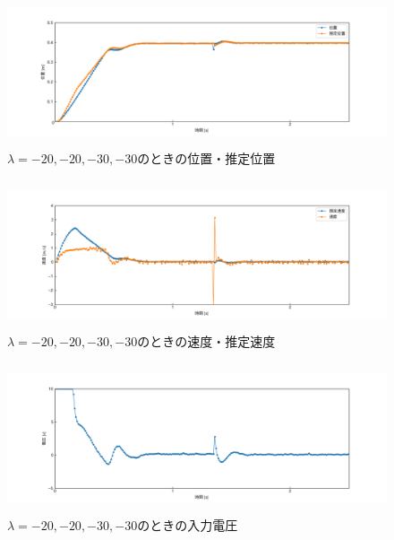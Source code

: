 \documentclass[12pt]{jsarticle}
\begin{document}
\begin{figure}[H]
  \begin{center}
    \includegraphics[clip,width=13.0cm, height=4.4cm]{../img/Exp12-1.png}
    \caption{$\lambda=-20, -20, -30, -30$のときの位置・推定位置}
    \label{Exp12-1}
  \end{center}
\end{figure}
\begin{figure}[H]
  \begin{center}
    \includegraphics[clip,width=13.0cm, height=4.4cm]{../img/Exp12-2.png}
    \caption{$\lambda=-20, -20, -30, -30$のときの速度・推定速度}
    \label{Exp12-2}
  \end{center}
\end{figure}
\begin{figure}[H]
  \begin{center}
    \includegraphics[clip,width=13.0cm, height=4.4cm]{../img/Exp12-3.png}
    \caption{$\lambda=-20, -20, -30, -30$のときの入力電圧}
    \label{Exp12-3}
  \end{center}
\end{figure}
\end{document}
